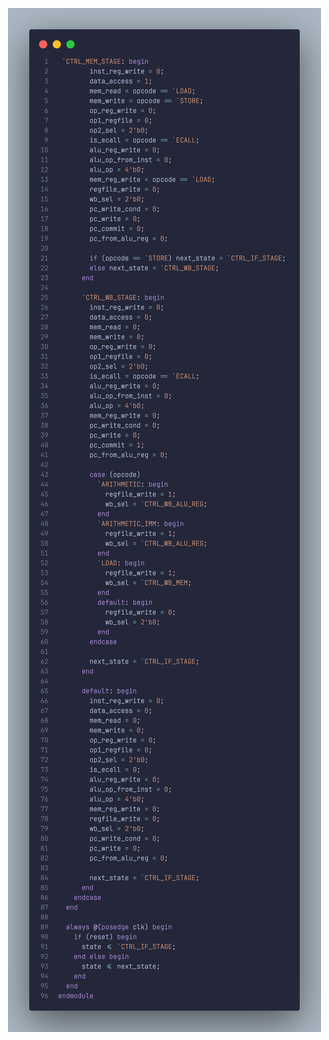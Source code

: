 \documentclass{scrartcl}
\begin{document}
\begin{center}
  \includegraphics[scale=0.15]{code_screenshot/control_unit_3.png}
\end{center}
\end{document}
